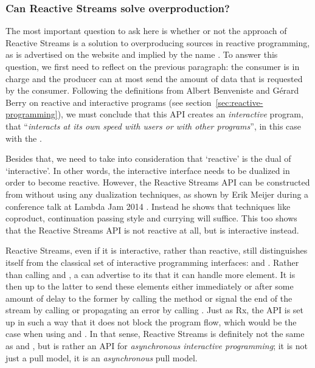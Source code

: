 \subsubsection{Can Reactive Streams solve overproduction?}
The most important question to ask here is whether or not the approach of Reactive Streams is a solution to overproducing sources in reactive programming, as is advertised on the website and implied by the name \cite{Reactive-Streams}. To answer this question, we first need to reflect on the previous paragraph: the consumer is in charge and the producer can at most send the amount of data that is requested by the consumer. Following the definitions from Albert Benveniste and G\'erard Berry \cite{berry1991-Reactive} on reactive and interactive programs (see section~\ref{sec:reactive-programming}), we must conclude that this API creates an \emph{interactive} program, that ``\textit{interacts at its own speed with users or with other programs}'', in this case with the .

Besides that, we need to take into consideration that `reactive' is the dual of `interactive'. In other words, the interactive interface needs to be dualized in order to become reactive. However, the Reactive Streams API can be constructed from \ieb without using any dualization techniques, as shown by Erik Meijer during a conference talk at Lambda Jam 2014 \cite{meijer2014-Derivation}. Instead he shows that techniques like coproduct, continuation passing style and currying will suffice. This too shows that the Reactive Streams API is not reactive at all, but is interactive instead.

Reactive Streams, even if it is interactive, rather than reactive, still distinguishes itself from the classical set of interactive programming interfaces: \ieb and \ier. Rather than calling  and , a  can advertise to its  that it can handle  more element. It is then up to the latter to send these elements either immediately or after some amount of delay to the former by calling the  method or signal the end of the stream by calling  or propagating an error by calling . Just as Rx, the API is set up in such a way that it does not block the program flow, which would be the case when using \ieb and \ier. In that sense, Reactive Streams is definitely not the same as \ieb and \ier, but is rather an API for \textit{asynchronous interactive programming}; it is not just a pull model, it is an \textit{asynchronous} pull model.


